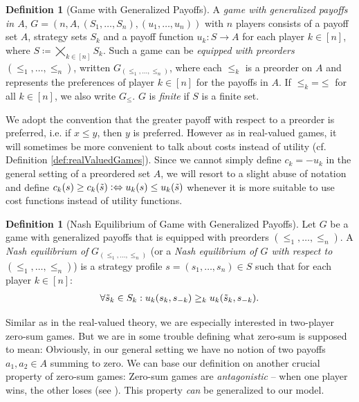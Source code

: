 \documentclass[a4paper,DIV=11]{scrreprt}
\theoremstyle{definition}
\newtheorem{defn}[thm]{Definition} %
\begin{document}
    \begin{defn}[Game with Generalized Payoffs]
        A \emph{game with generalized payoffs in $A$}, $G = (n, A, (S_1, \dots, S_n), (u_1, \dots, u_n))$ with $n$ players consists of a payoff set $A$, strategy sets $S_k$ and a payoff function $u_k: S \to A$ for each player $k \in [n]$, where $S \coloneqq \bigtimes_{k \in [n]} S_k$.        
        Such a game can be \emph{equipped with preorders} $(\leq_1, \dots, \leq_n)$, written $G_{(\leq_1, \dots, \leq_n)}$, where each $\leq_k$ is a preorder on $A$ and represents the preferences of player $k \in [n]$ for the payoffs in $A$.
        If $\leq_k \mathbin{=} \leq$ for all $k \in [n]$, we also write $G_\leq$.
        $G$ is \emph{finite} if $S$ is a finite set.
    \end{defn}
    We adopt the convention that the greater payoff with respect to a preorder is preferred, i.e. if $x \leq y$, then $y$ is preferred. However as in real-valued games, it will sometimes be more convenient to talk about costs instead of utility (cf. Definition \ref{def:realValuedGames}). Since we cannot simply define $c_k = -u_k$ in the general setting of a preordered set $A$, we will resort to a slight abuse of notation and define $c_k(s) \geq c_k(\tilde{s}) \mathrel{\vcentcolon\Leftrightarrow} u_k(s) \leq u_k(\tilde{s})$ whenever it is more suitable to use cost functions instead of utility functions.
    
    \begin{defn}[Nash Equilibrium of Game with Generalized Payoffs]
        Let $G$ be a game with generalized payoffs that is equipped with preorders $(\leq_1, \dots, \leq_n)$.
        A \emph{Nash equilibrium of} $G_{(\leq_1, \dots, \leq_n)}$ (or a \emph{Nash equilibrium of $G$ with respect to $(\leq_1, \dots, \leq_n)$})
        is a strategy profile $s = (s_1, \dots, s_n) \in S$ such that for each player $k \in [n]$:
        \begin{gather}
            \forall \tilde{s}_k \in S_k: u_k(s_k, s_{-k}) \geq_k u_k(\tilde{s}_k, s_{-k}).
            \label{eq:nashEquilibriumGeneralizedPayoffs}
        \end{gather}
    \end{defn}
    
    Similar as in the real-valued theory, we are especially interested in two-player zero-sum games.
    But we are in some trouble defining what zero-sum is supposed to mean: Obviously, in our general setting we have no notion of two payoffs $a_1, a_2 \in A$ summing to zero.
    We can base our definition on another crucial property of zero-sum games: Zero-sum games are \emph{antagonistic} -- when one player wins, the other loses (see \cite{bib:andersonAntagonisticGames}). This property \emph{can} be generalized to our model.
    
\end{document}
